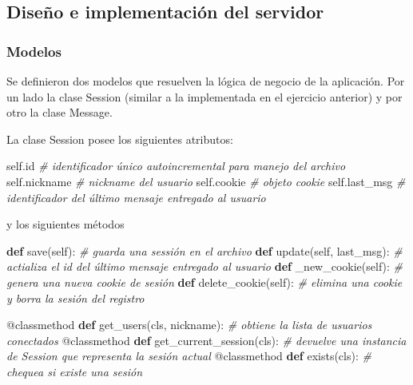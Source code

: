 \documentclass[12pt]{extarticle}
\newenvironment{Shaded}{}{}
\newcommand{\KeywordTok}[1]{\textcolor[rgb]{0.00,0.44,0.13}{\textbf{{#1}}}}
\newcommand{\CommentTok}[1]{\textcolor[rgb]{0.38,0.63,0.69}{\textit{{#1}}}}
\newcommand{\NormalTok}[1]{{#1}}
\newcommand{\VariableTok}[1]{\textcolor[rgb]{0.10,0.09,0.49}{{#1}}}
\newcommand{\BuiltInTok}[1]{{#1}}
\newcommand{\AttributeTok}[1]{\textcolor[rgb]{0.49,0.56,0.16}{{#1}}}
\begin{document}
\subsection{Diseño e implementación del
servidor}\label{diseuxf1o-e-implementaciuxf3n-del-servidor-1}

\subsubsection{Modelos}\label{modelos-1}

Se definieron dos modelos que resuelven la lógica de negocio de la
aplicación. Por un lado la clase Session (similar a la implementada en
el ejercicio anterior) y por otro la clase Message.

La clase Session posee los siguientes atributos:

\begin{Shaded}
\begin{Highlighting}[]
\VariableTok{self}\NormalTok{.}\BuiltInTok{id} \CommentTok{# identificador único autoincremental para manejo del archivo}
\VariableTok{self}\NormalTok{.nickname }\CommentTok{# nickname del usuario }
\VariableTok{self}\NormalTok{.cookie }\CommentTok{# objeto cookie}
\VariableTok{self}\NormalTok{.last_msg }\CommentTok{# identificador del último mensaje entregado al usuario}
\end{Highlighting}
\end{Shaded}

y los siguientes métodos

\begin{Shaded}
\begin{Highlighting}[]
\KeywordTok{def}\NormalTok{ save(}\VariableTok{self}\NormalTok{): }
\CommentTok{# guarda una sessión en el archivo}
\KeywordTok{def}\NormalTok{ update(}\VariableTok{self}\NormalTok{, last_msg): }
\CommentTok{# actializa el id del último mensaje entregado al usuario}
\KeywordTok{def}\NormalTok{ _new_cookie(}\VariableTok{self}\NormalTok{): }
\CommentTok{# genera una nueva cookie de sesión}
\KeywordTok{def}\NormalTok{ delete_cookie(}\VariableTok{self}\NormalTok{): }
\CommentTok{# elimina una cookie y borra la sesión del registro}
    
\AttributeTok{@classmethod}
\KeywordTok{def}\NormalTok{ get_users(cls, nickname): }
\CommentTok{# obtiene la lista de usuarios conectados}
\AttributeTok{@classmethod}
\KeywordTok{def}\NormalTok{ get_current_session(cls): }
\CommentTok{# devuelve una instancia de Session que representa la sesión actual}
\AttributeTok{@classmethod}
\KeywordTok{def}\NormalTok{ exists(cls): }
\CommentTok{# chequea si existe una sesión}
\end{Highlighting}
\end{Shaded}
\end{document}
